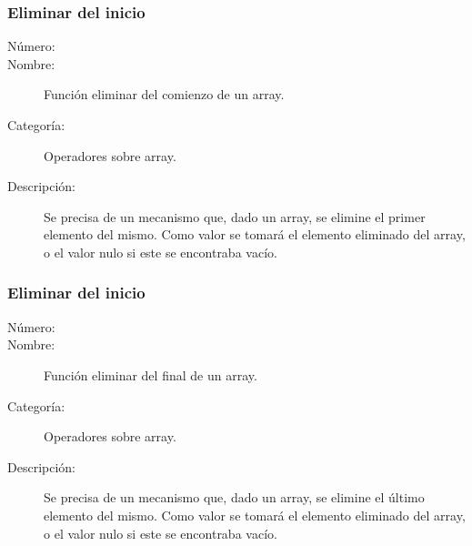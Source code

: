 \subsubsection{Eliminar del inicio}
\begin{framed}
	\begin{description}
		\item [Número:] \cn
		\item [Nombre:] Función eliminar del comienzo de un array.
		\item [Categoría:] Operadores sobre array.
		\item [Descripción:] Se precisa de un mecanismo que, dado un array, se elimine
el primer elemento del mismo. Como valor se tomará el elemento eliminado del array, o el valor nulo si este se encontraba vacío.
	\end {description}
\end{framed}


\subsubsection{Eliminar del inicio}
\begin{framed}
	\begin{description}
		\item [Número:] \cn
		\item [Nombre:] Función eliminar del final de un array.
		\item [Categoría:] Operadores sobre array.
		\item [Descripción:] Se precisa de un mecanismo que, dado un array, se elimine
el último elemento del mismo. Como valor se tomará el elemento eliminado del array, o el valor nulo si este se encontraba vacío.
	\end {description}
\end{framed}
